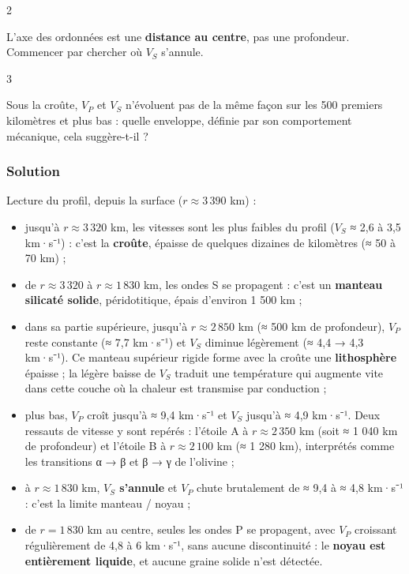 \documentclass[11pt,a4paper]{article}
\providecommand{\tightlist}{\setlength{\itemsep}{0pt}\setlength{\parskip}{0pt}}
\begin{document}
\begin{indication}{2}

L'axe des ordonnées est une \textbf{distance au centre}, pas une profondeur. Commencer par chercher où \(V_S\) s'annule.

\end{indication}

\begin{indication}{3}

Sous la croûte, \(V_P\) et \(V_S\) n'évoluent pas de la même façon sur les 500 premiers kilomètres et plus bas : quelle enveloppe, définie par son comportement mécanique, cela suggère-t-il ?

\end{indication}

\hypertarget{solution-14}{%
\subsubsection{Solution}\label{solution-14}}

Lecture du profil, depuis la surface (\(r \approx 3\,390\) km) :

\begin{itemize}
\tightlist
\item
  jusqu'à \(r \approx 3\,320\) km, les vitesses sont les plus faibles du profil (\(V_S\) ≈ 2,6 à 3,5 km·s⁻¹) : c'est la \textbf{croûte}, épaisse de quelques dizaines de kilomètres (≈ 50 à 70 km) ;
\item
  de \(r \approx 3\,320\) à \(r \approx 1\,830\) km, les ondes S se propagent : c'est un \textbf{manteau silicaté solide}, péridotitique, épais d'environ 1 500 km ;
\item
  dans sa partie supérieure, jusqu'à \(r \approx 2\,850\) km (≈ 500 km de profondeur), \(V_P\) reste constante (≈ 7,7 km·s⁻¹) et \(V_S\) diminue légèrement (≈ 4,4 → 4,3 km·s⁻¹). Ce manteau supérieur rigide forme avec la croûte une \textbf{lithosphère} épaisse ; la légère baisse de \(V_S\) traduit une température qui augmente vite dans cette couche où la chaleur est transmise par conduction ;
\item
  plus bas, \(V_P\) croît jusqu'à ≈ 9,4 km·s⁻¹ et \(V_S\) jusqu'à ≈ 4,9 km·s⁻¹. Deux ressauts de vitesse y sont repérés : l'étoile A à \(r \approx 2\,350\) km (soit ≈ 1 040 km de profondeur) et l'étoile B à \(r \approx 2\,100\) km (≈ 1 280 km), interprétés comme les transitions α → β et β → γ de l'olivine ;
\item
  à \(r \approx 1\,830\) km, \textbf{\(V_S\) s'annule} et \(V_P\) chute brutalement de ≈ 9,4 à ≈ 4,8 km·s⁻¹ : c'est la limite manteau / noyau ;
\item
  de \(r = 1\,830\) km au centre, seules les ondes P se propagent, avec \(V_P\) croissant régulièrement de 4,8 à 6 km·s⁻¹, sans aucune discontinuité : le \textbf{noyau est entièrement liquide}, et aucune graine solide n'est détectée.
\end{itemize}
\end{document}
